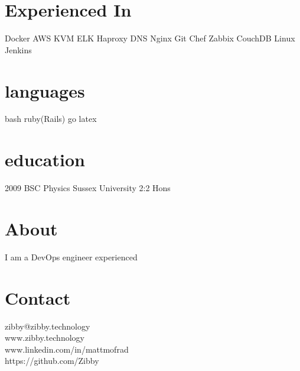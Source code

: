 \documentclass[]{friggeri-cv-a4}
\begin{document}

\begin{aside}
	\section{Experienced In}
    Docker
    AWS
    KVM
    ELK
    Haproxy
    DNS
    Nginx
    Git
    Chef
    Zabbix
    CouchDB
		Linux
		Jenkins
  \section{languages}
    bash
		ruby(Rails)
    go
    latex
  \section{education}
    2009 BSC Physics Sussex University 2:2 Hons
\end{aside}

\section{About}
I am a DevOps engineer experienced  

\section{Contact}
\faEnvelope\hspace{10pt}zibby@zibby.technology\\
\faGithub\hspace{10pt}www.zibby.technology \\
\faLinkedinSquare\hspace{10pt}www.linkedin.com/in/mattmofrad\\
\faGithub\hspace{10pt}https://github.com/Zibby\\
\end{document}
